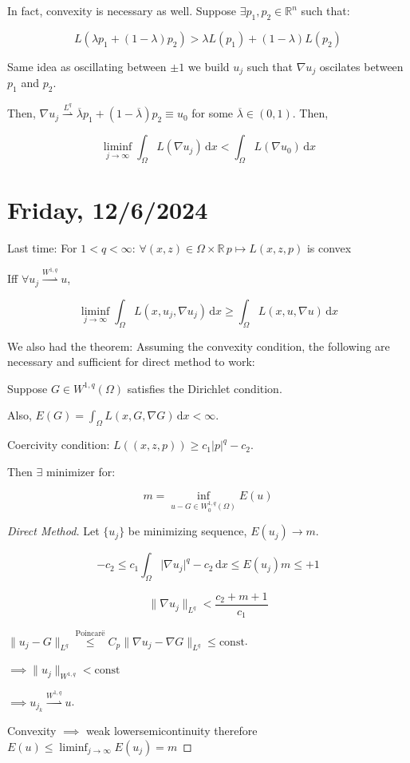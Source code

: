 \documentclass{article}
\theoremstyle{definition}
\begin{document}
In fact, convexity is necessary as well. Suppose \(\exists p_1, p_2 \in \mathbb{R}^n\) such that:

\[
    L(\lambda p_1 + (1-\lambda)p_2) > \lambda L(p_1) + (1-\lambda) L(p_2)
\]

Same idea as oscillating between \(\pm 1\) we build \(u_j\) such that \(\nabla u_j\) oscilates between \(p_1\) and \(p_2\).

Then, \(\nabla u_j \overset{L^q}{\rightharpoonup} \overline{\lambda} p_1 + (1-\overline{\lambda})p_2 \equiv u_0\) for some \(\overline{\lambda} \in (0,1)\). Then,

\[
    \liminf_{j \to \infty} \int_{\Omega} L(\nabla u_j) \,\mathrm{d}x < \int_{\Omega} L(\nabla u_0) \,\mathrm{d}x 
\]

\section*{Friday, 12/6/2024}

Last time: For \(1 < q < \infty\):  \(\forall (x,z)\in \Omega \times \mathbb{R}\, p \mapsto L(x,z,p)\) is convex

Iff \(\forall u_j \overset{W^{1,q}}{\rightharpoonup} u\),

\[
    \liminf_{j \to \infty} \int_{\Omega} L(x,u_j, \nabla u_j) \,\mathrm{d}x \geq \int_{\Omega} L(x,u,\nabla u) \,\mathrm{d}x 
\]

We also had the theorem: Assuming the convexity condition, the following are necessary and sufficient for direct method to work:

Suppose \(G \in W^{1,q}(\Omega)\) satisfies the Dirichlet condition.

Also, \(E(G) = \int_{\Omega} L(x,G,\nabla G) \,\mathrm{d}x < \infty\). 

Coercivity condition: \(L((x,z,p)) \geq c_1 \vert p \vert ^ q - c_2\).

Then \(\exists\) minimizer for:

\[
    m = \inf_{u - G \in W_0^{1,q}(\Omega)} E(u)
\]

\begin{proof}
    [Direct Method]

    Let \(\{ u_j \}\) be minimizing sequence, \(E(u_j) \to m\).

    \[
        - c_2 \leq c_1 \int_{\Omega} \vert \nabla u_j \vert ^ q - c_2 \,\mathrm{d}x \leq E(u_j) m\leq +1
    \]

    \[
        \lVert \nabla u_j \rVert _{L^q} < \frac{c_2 + m + 1}{c_1}
    \]

    \(\lVert u_j - G \rVert _{L^q} \overset{\text{Poincar\"e}}{\leq} C_p \lVert \nabla u_j - \nabla G \rVert _{L^q} \leq \text{const}\).
    
    \(\implies \lVert u_j \rVert _{W^{1,q}} < \text{const} \) 

    \(\implies u_{j_k} \overset{W^{1,q}}{\rightharpoonup} u\).
    
    Convexity \(\implies\) weak lowersemicontinuity therefore \(E(u) \leq \liminf_{j \to \infty} E(u_j) = m\) 

\end{proof}
\end{document}
